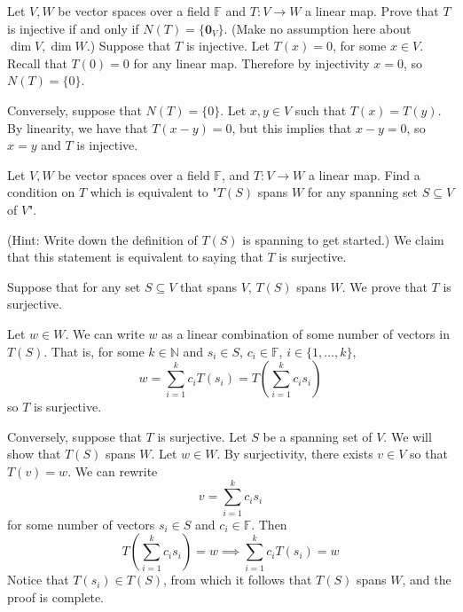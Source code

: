 \documentclass{eh-homework}
\begin{document}
    \newpage
    \begin{question}{6}
        Let \( V, W \) be vector spaces over a field \( \mathbb{F} \) and \( T : V \to W \) a linear map. Prove that \( T \) is injective if and only if \( N(T) = \{\mathbf{0}_V\} \). (Make no assumption here about \( \dim V, \dim W \).)
        \tcblower
        Suppose that \(T\) is injective. Let \(T(x) = 0\), for some \(x \in V\). Recall that \(T(0) = 0\) for any linear map. Therefore by injectivity \(x = 0\), so \(N(T) = \{ 0 \}\).

        Conversely, suppose that \(N(T) = \{ 0 \}\). Let \(x,y \in V\) such that \(T(x) = T(y)\). By linearity, we have that \(T(x - y) = 0\), but this implies that \(x - y = 0\), so \(x = y\) and \(T\) is injective.
    \end{question}
    \newpage
    \begin{question}{7}
        Let \( V, W \) be vector spaces over a field \( \mathbb{F} \), and \( T : V \to W \) a linear map. Find a condition on \( T \) which is equivalent to "\( T(S) \) spans \( W \) for any spanning set \( S \subseteq V \) of \( V \)".

        (Hint: Write down the definition of \( T(S) \) is spanning to get started.)
        \tcblower
        We claim that this statement is equivalent to saying that \(T\) is surjective.

        Suppose that for any set \(S \subseteq V\) that spans \(V\), \(T(S)\) spans \(W\). We prove that \(T\) is surjective.

        Let \(w \in W\). We can write \(w\) as a linear combination of some number of vectors in \(T(S)\). That is, for some \(k \in \mathbb{N}\) and \(s_i \in S\), \(c_i \in \mathbb{F}\), \(i \in \{ 1, ..., k \}\),
        \[
            w = \sum_{i=1}^{k} c_i T(s_i) = T \left(\sum_{i=1}^{k}c_i s_i\right)
        \]
        so \(T\) is surjective.

        Conversely, suppose that \(T\) is surjective. Let \(S\) be a spanning set of \(V\). We will show that \(T(S)\) spans \(W\). Let \(w \in W\). By surjectivity, there exists \(v \in V\) so that \(T(v) = w\). We can rewrite
        \[
            v = \sum_{i=1}^{k} c_i s_i
        \]
        for some number of vectors \(s_i \in S\) and \(c_i \in \mathbb{F}\). Then
        \[
            T\left( \sum_{i=1}^{k} c_i s_i \right) = w \implies \sum_{i=1}^{k} c_i T(s_i) = w
        \]
        Notice that \(T(s_i) \in T(S)\), from which it follows that \(T(S)\) spans \(W\), and the proof is complete.
    \end{question}
\end{document}

